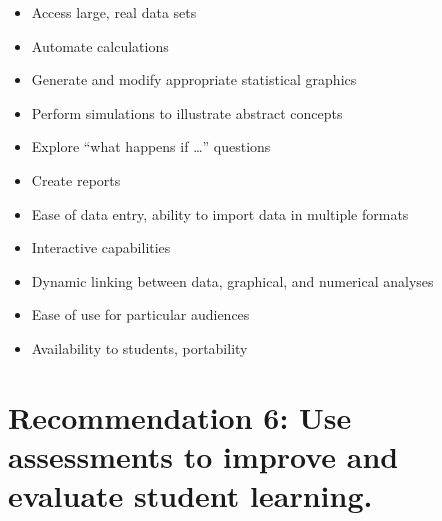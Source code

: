  \vspace{.2in}
\noindent{}
\renewcommand\labelitemi{$\checkmark$}

\begin{itemize}[leftmargin=1cm, itemsep=.2em]
\item Access large, real data sets
\item Automate calculations
\item Generate and modify appropriate statistical graphics
\item Perform simulations to illustrate abstract concepts
\item Explore ``what happens if \ldots'' questions
\item Create reports
\end{itemize}

\vspace{.2in}
 
\noindent{}

\renewcommand\labelitemi{$\filledsquare$}

\begin{itemize}[leftmargin=1cm, itemsep=.2em]
\item Ease of data entry, ability to import data in multiple formats
\item Interactive capabilities
\item Dynamic linking between data, graphical, and numerical analyses 
\item Ease of use for particular audiences
\item Availability to students, portability\\
\end{itemize}


\section{\textbf{Recommendation 6: Use assessments to improve and evaluate student learning.}}

